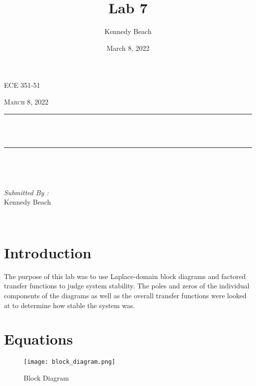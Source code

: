 \documentclass[12pt]{report}
\title{Lab 7}
\author{Kennedy Beach}
\date{March 8, 2022}
\makeatletter
\let\thetitle\@title
\makeatother
\begin{document}
\begin{titlepage}
\centering
\vspace*{0.5 cm}
\begin{center}    \textsc{\Large   ECE 351-51 }\\[2.0 cm]
\end{center}%
\textsc{\Large March 8, 2022}\\[0.5 cm] %
\rule{\linewidth}{0.2 mm} \\[0.4 cm]
{ \huge \bfseries \thetitle}\\
\rule{\linewidth}{0.2 mm} \\[1.5 cm]
\begin{minipage}{0.4\textwidth}
\begin{flushleft} \large
\end{flushleft}
\end{minipage}~
\begin{minipage}{0.4\textwidth}
\begin{flushright} \large
\emph{Submitted By :} \\
Kennedy Beach
\end{flushright}
\end{minipage}\\[2 cm]
\end{titlepage}
\tableofcontents
\pagebreak
\renewcommand{\thesection}{\arabic{section}}
\section{Introduction}
The purpose of this lab was to use Laplace-domain block diagrams and factored transfer functions to judge system stability. The poles and zeros of the individual components of the diagrams as well as the overall transfer functions were looked at to determine how stable the system was.
\section{Equations}
\begin{figure}[htp]
    \centering
    \texttt{[image: block\_diagram.png]}
    \caption{Block Diagram}
\end{figure}
\end{document}
